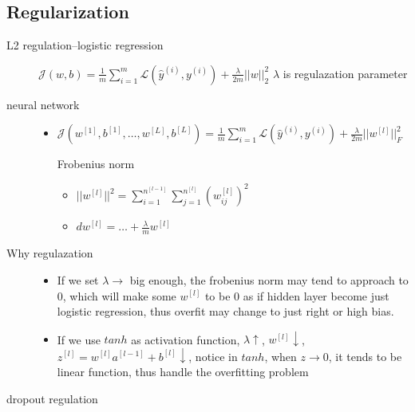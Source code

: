 \documentclass[11pt]{article}
\begin{document}
\subsection{Regularization}
\label{sec-4-3}
\begin{description}
\item[{L2 regulation--logistic regression}] $\mathcal{J}(w,b)=\frac{1}{m}\displaystyle\sum_{i=1}^m\mathcal{L}(\hat{y}^{(i)}
        ,y^{(i)})+\frac{\lambda}{2m}||w||_2^2$
        $\lambda$ is regulazation parameter
\item[{neural network}] \begin{itemize}
\item $\mathcal{J}(w^{[1]},b^{[1]},\dots,w^{[L]},b^{[L]})=\frac{1}{m}\displaystyle\sum_{i=1}^m
       \mathcal{L}(\hat{y}^{(i)},y^{(i)})+\frac{\lambda}{2m}||w^{[l]}||_F^2$
\item[{Frobenius norm}] \begin{itemize}
\item $||w^{[l]}||^2=\displaystyle\sum_{i=1}^{n^{[l-1]}}\sum_{j=1}^{n^{[l]}}
         (w_{ij}^{[l]})^2$
\item $dw^{[l]}=\dots + \frac{\lambda}{m}w^{[l]}$
\end{itemize}
\end{itemize}
\item[{Why regulazation}] \begin{itemize}
\item If we set $\lambda\to$ big enough, the frobenius norm may tend to approach to 0, which
will make some $w^{[l]}$ to be 0 as if hidden layer become just logistic
regression, thus overfit may change to just right or high bias.
\item If we use $tanh$ as activation function, $\lambda\uparrow$, $w^{[l]}\downarrow$,$z^{[l]}=w^{[l]}a^{[l-1]}+b^{[l]}\downarrow$,
notice in $tanh$, when $z\to 0$, it tends to be linear function, thus handle
the overfitting problem
\end{itemize}
\item[{dropout regulation}]
\end{description}
\end{document}
